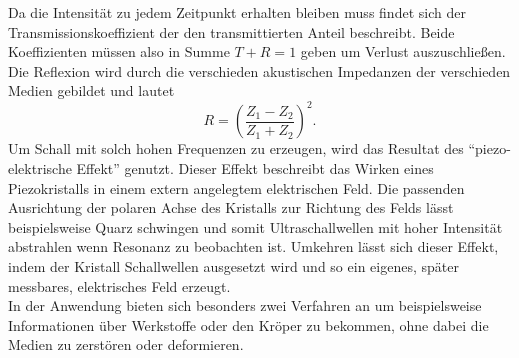 Da die Intensität zu jedem Zeitpunkt erhalten bleiben muss findet sich der Transmissionskoeffizient der den transmittierten Anteil beschreibt.
Beide Koeffizienten müssen also in Summe $T+R=1$ geben um Verlust auszuschließen.
Die Reflexion wird durch die verschieden akustischen Impedanzen der verschieden Medien gebildet und lautet
\begin{equation*}
    R= \left( \frac{Z_1 - Z_2}{Z_1 + Z_2}\right)^2.
\end{equation*}
Um Schall mit solch hohen Frequenzen zu erzeugen, wird das Resultat des \enquote{piezo-elektrische Effekt} genutzt.
Dieser Effekt beschreibt das Wirken eines Piezokristalls in einem extern angelegtem elektrischen Feld. Die passenden Ausrichtung der polaren Achse des Kristalls zur Richtung des Felds 
lässt beispielsweise Quarz schwingen und somit Ultraschallwellen mit hoher Intensität abstrahlen wenn Resonanz zu beobachten ist.  
Umkehren lässt sich dieser Effekt, indem der Kristall Schallwellen ausgesetzt wird und so ein eigenes, später messbares, elektrisches Feld erzeugt. 
\\
\newline
In der Anwendung bieten sich besonders zwei Verfahren an um beispielsweise Informationen über Werkstoffe oder den Kröper zu bekommen, ohne dabei 
die Medien zu zerstören oder deformieren.
\\
\newline
